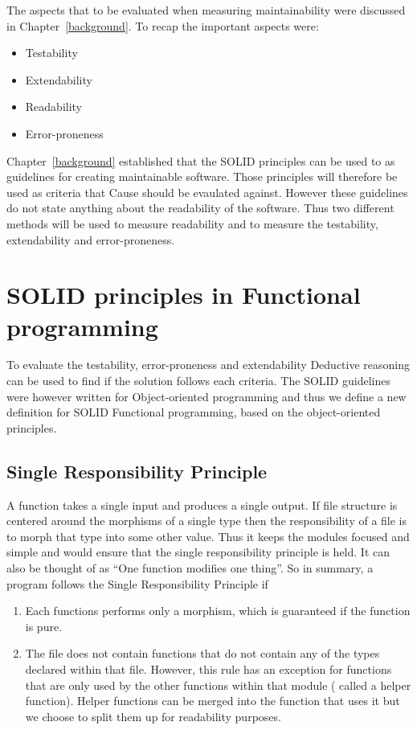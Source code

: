 The aspects that to be evaluated when measuring maintainability were discussed
in Chapter~\ref{background}. To recap the important aspects were:

\begin{itemize}
    \item Testability
    \item Extendability
    \item Readability
    \item Error-proneness
\end{itemize}

Chapter~\ref{background} established that the SOLID principles can be used to
as guidelines for creating maintainable software. Those principles will
therefore be used as criteria that Cause should be evaulated against.  However
these guidelines do not state anything about the readability of the software.
Thus two different methods will be used to measure readability and to measure
the testability, extendability and error-proneness.


\section{SOLID principles in Functional programming}\label{dependencyinjection}

To evaluate the testability, error-proneness and extendability  Deductive
reasoning can be used to find if the solution follows each criteria.  The SOLID
guidelines were however written for Object-oriented programming and thus we define 
a new definition for SOLID Functional programming, based on the object-oriented
principles.

\subsection{Single Responsibility Principle}

A function takes a single input and produces a single output. If file structure
is centered around the morphisms of a single type then the responsibility of a
file is to morph that type into some other value. Thus it keeps the modules
focused and simple and would ensure that the single responsibility principle is
held. It can also be thought of as ``One function modifies one thing''. So in
summary, a program follows the Single Responsibility Principle if 

\begin{enumerate}
    \item Each functions performs only a morphism, which is guaranteed if the function
        is pure.
	\item The file does not contain functions that do not contain any of the
types declared within that file. However, this rule has an exception for
functions that are only used by the other functions within that module ( called
a helper function). Helper functions can be merged into the function that uses
it but we choose to split them up for readability purposes.
\end{enumerate}

